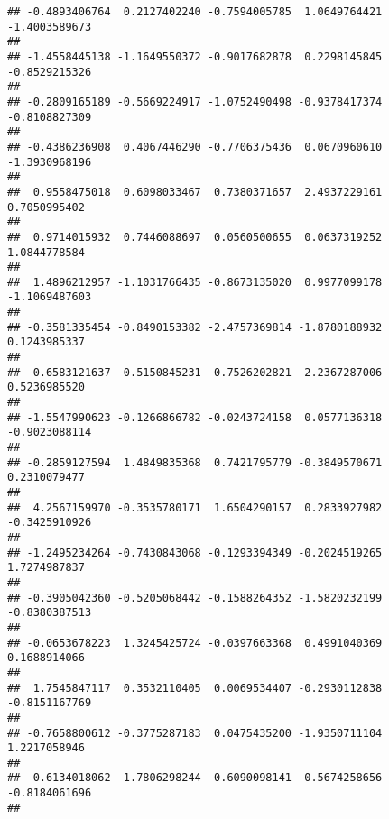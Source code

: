 \documentclass[]{article}
\begin{document}
\begin{verbatim}
## -0.4893406764  0.2127402240 -0.7594005785  1.0649764421 -1.4003589673 
##                                                                       
## -1.4558445138 -1.1649550372 -0.9017682878  0.2298145845 -0.8529215326 
##                                                                       
## -0.2809165189 -0.5669224917 -1.0752490498 -0.9378417374 -0.8108827309 
##                                                                       
## -0.4386236908  0.4067446290 -0.7706375436  0.0670960610 -1.3930968196 
##                                                                       
##  0.9558475018  0.6098033467  0.7380371657  2.4937229161  0.7050995402 
##                                                                       
##  0.9714015932  0.7446088697  0.0560500655  0.0637319252  1.0844778584 
##                                                                       
##  1.4896212957 -1.1031766435 -0.8673135020  0.9977099178 -1.1069487603 
##                                                                       
## -0.3581335454 -0.8490153382 -2.4757369814 -1.8780188932  0.1243985337 
##                                                                       
## -0.6583121637  0.5150845231 -0.7526202821 -2.2367287006  0.5236985520 
##                                                                       
## -1.5547990623 -0.1266866782 -0.0243724158  0.0577136318 -0.9023088114 
##                                                                       
## -0.2859127594  1.4849835368  0.7421795779 -0.3849570671  0.2310079477 
##                                                                       
##  4.2567159970 -0.3535780171  1.6504290157  0.2833927982 -0.3425910926 
##                                                                       
## -1.2495234264 -0.7430843068 -0.1293394349 -0.2024519265  1.7274987837 
##                                                                       
## -0.3905042360 -0.5205068442 -0.1588264352 -1.5820232199 -0.8380387513 
##                                                                       
## -0.0653678223  1.3245425724 -0.0397663368  0.4991040369  0.1688914066 
##                                                                       
##  1.7545847117  0.3532110405  0.0069534407 -0.2930112838 -0.8151167769 
##                                                                       
## -0.7658800612 -0.3775287183  0.0475435200 -1.9350711104  1.2217058946 
##                                                                       
## -0.6134018062 -1.7806298244 -0.6090098141 -0.5674258656 -0.8184061696 
##                                                                       

\end{verbatim}
\end{document}
